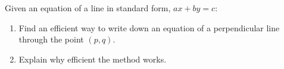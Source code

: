 \begin{prob}
Given an equation of a line in standard form, $ax+by=c$:  
\begin{enumerate}
\item Find an efficient way to write down an equation of a perpendicular line through the point $(p,q)$.  
\item Explain why efficient the method works. 
\end{enumerate}
\end{prob}


